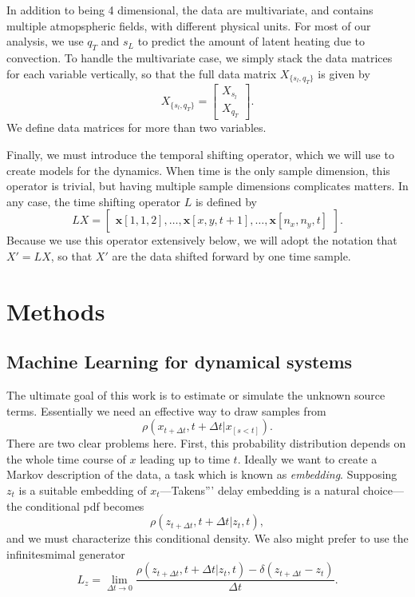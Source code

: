 \documentclass{report}
\begin{document}
In addition to being 4 dimensional, the data are multivariate, and contains
multiple atmopspheric fields, with different physical units. For most of our
analysis, we use $q_T$ and $s_L$ to predict the amount of latent heating due to
convection. To handle the multivariate case, we simply stack the data matrices
for each variable vertically, so that the full data matrix $X_{\{s_l, q_T\}}$ is given by
\[
  X_{\{s_l, q_T\}}=\begin{bmatrix}
    X_{s_l}\\
    X_{q_T}
  \end{bmatrix}.
\]
We define data matrices for more than two variables.

Finally, we must introduce the temporal shifting operator, which we will use to
create models for the dynamics. When time is the only sample dimension, this
operator is trivial, but having multiple sample dimensions complicates matters.
In any case, the time shifting  operator $L$ is defined by
\[
  LX =
  \begin{bmatrix}
    \mathbf{x}[1,1,2],\ldots,\mathbf{x}[x, y, t+1], \ldots, \mathbf{x}[n_x, n_y, t]
  \end{bmatrix}.
\]
Because we use this operator extensively below, we will adopt the notation that $X' =
LX$, so that $X'$ are the data shifted forward by one time sample.

\chapter{Methods}

\section{Machine Learning for dynamical systems}

The ultimate goal of this work is to estimate or simulate the unknown source
terms. Essentially we need an effective way to draw samples
from
\[ \rho(x_{t+\Delta t}, t + \Delta t |x_{[s < t]}).\] There are two clear problems here. 
First, this probability distribution depends on the whole time course of
$x$ leading up to time $t$. 
Ideally we want to create a Markov description of the data, a task which is
known as \emph{embedding}. 
Supposing $z_t$ is a suitable embedding of $x_t$---Takens''' delay embedding is a natural choice---the conditional pdf becomes
\[\rho(z_{t+\Delta t}, t+ \Delta t| z_t, t),\]
and we must characterize this conditional density.
We also might prefer to use the infinitesmimal generator
\[L_z = \lim_{\Delta t \rightarrow 0} \frac{\rho(z_{t+\Delta t}, t+ \Delta t| z_t,
    t) - \delta(z_{t+\Delta t} - z_t) }{\Delta t}.\]
\end{document}
